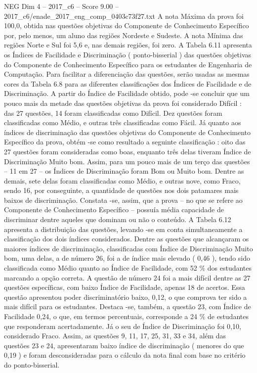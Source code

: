 \begin{textsample}{NEG Dim 4 – 2017\_c6 – Score 9.00 – 2017\_c6/enade\_2017\_eng\_comp\_0403c73f27.txt}
A nota Máxima da prova foi 100,0, obtida nas questões objetivas do Componente de Conhecimento Específico por, pelo menos, um aluno das regiões Nordeste e Sudeste.
A nota Mínima das regiões Norte e Sul foi 5,6 e, nas demais regiões, foi zero.
A Tabela 6.11 apresenta os Índices de Facilidade e Discriminação ( ponto-bisserial ) das questões objetivas do Componente de Conhecimento Específico para os estudantes de Engenharia de Computação.
Para facilitar a diferenciação das questões, serão usadas as mesmas cores da Tabela 6.8 para as diferentes classificações dos Índices de Facilidade e de Discriminação.
A partir do Índice de Facilidade obtido, pode -se concluir que um pouco mais da metade das questões objetivas da prova foi considerado Difícil : das 27 questões, 14 foram classificadas como Difícil.
Dez questões foram classificadas como Médio, e outras três classificadas como Fácil.
Já quanto aos índices de discriminação das questões objetivas do Componente de Conhecimento Específico da prova, obtém -se como resultado a seguinte classificação : oito das 27 questões foram consideradas como boas, enquanto três delas tiveram Índice de Discriminação Muito bom.
Assim, para um pouco mais de um terço das questões – 11 em 27 – os Índices de Discriminação foram Bom ou Muito bom.
Dentre as demais, sete delas foram classificadas como Médio, e outras nove, como Fraco, sendo 16, por conseguinte, a quantidade de questões nos dois patamares mais baixos de discriminação.
Constata -se, assim, que a prova – no que se refere ao Componente de Conhecimento Específico – possuía média capacidade de discriminar dentre aqueles que dominam ou não o conteúdo.
A Tabela 6.12 apresenta a distribuição das questões, levando -se em conta simultaneamente a classificação dos dois índices considerados.
Dentre as questões que alcançaram os maiores índices de discriminação, classificadas com Índice de Discriminação Muito bom, uma delas, a de número 26, foi a de índice mais elevado ( 0,46 ), tendo sido classificada como Médio quanto ao Índice de Facilidade, com 52 \% dos estudantes marcando a opção correta.
A questão de número 24 foi a mais difícil dentre as 27 questões específicas, com baixo Índice de Facilidade, apenas 18 de acertos.
Essa questão apresentou poder discriminatório baixo, 0,12, o que comprova ter sido a mais difícil para os estudantes.
Destaca -se, também, a questão 23, com Índice de Facilidade 0,24, o que, em termos percentuais, corresponde a 24 \% de estudantes que responderam acertadamente.
Já o seu de Índice de Discriminação foi 0,10, considerado Fraco.
Assim, as questões 9, 11, 17, 25, 31, 33 e 34, além das questões 23 e 24, apresentaram baixo índice de discriminação ( menores do que 0,19 ) e foram desconsideradas para o cálculo da nota final com base no critério do ponto-bisserial.

\end{textsample}
